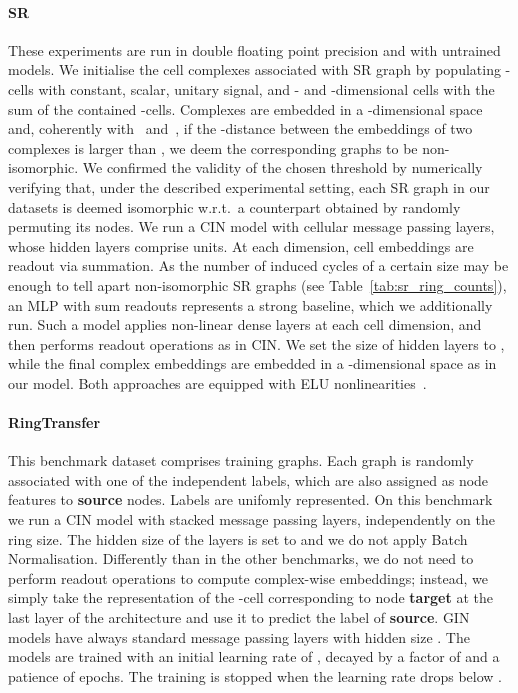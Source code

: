 \documentclass{article}
\begin{document}
\paragraph{SR} These experiments are run in double floating point precision and with untrained models. We initialise the cell complexes associated with SR graph by populating -cells with constant, scalar, unitary signal, and - and -dimensional cells with the sum of the contained -cells. Complexes are embedded in a -dimensional space and, coherently with~\citet{bodnar2021weisfeiler} and~\citet{bouritsas2020improving}, if the -distance between the embeddings of two complexes is larger than , we deem the corresponding graphs to be non-isomorphic. 
We confirmed the validity of the chosen threshold  by numerically verifying that, under the described experimental setting, each SR graph in our datasets is deemed isomorphic w.r.t.\ a counterpart obtained by randomly permuting its nodes.
We run a CIN model with  cellular message passing layers, whose hidden layers comprise  units. At each dimension, cell embeddings are readout via summation. As the number of induced cycles of a certain size may be enough to tell apart non-isomorphic SR graphs (see Table~\ref{tab:sr_ring_counts}), an MLP with sum readouts represents a strong baseline, which we additionally run. Such a model applies non-linear dense layers at each cell dimension, and then performs readout operations as in CIN. We set the size of hidden layers to , while the final complex embeddings are embedded in a -dimensional space as in our model. Both approaches are equipped with ELU nonlinearities~\citep{ELU}. 

\paragraph{RingTransfer} This benchmark dataset comprises  training graphs. Each graph is randomly associated with one of the  independent labels, which are also assigned as node features to \textbf{source} nodes. Labels are unifomly represented. On this benchmark we run a CIN model with  stacked message passing layers, independently on the ring size. The hidden size of the layers is set to  and we do not apply Batch Normalisation. Differently than in the other benchmarks, we do not need to perform readout operations to compute complex-wise embeddings; instead, we simply take the representation of the -cell corresponding to node \textbf{target} at the last layer of the architecture and use it to predict the label of \textbf{source}. GIN models have always  standard message passing layers with hidden size . The models are trained with an initial learning rate of , decayed by a factor of  and a patience of  epochs. The training is stopped when the learning rate drops below .
\end{document}
